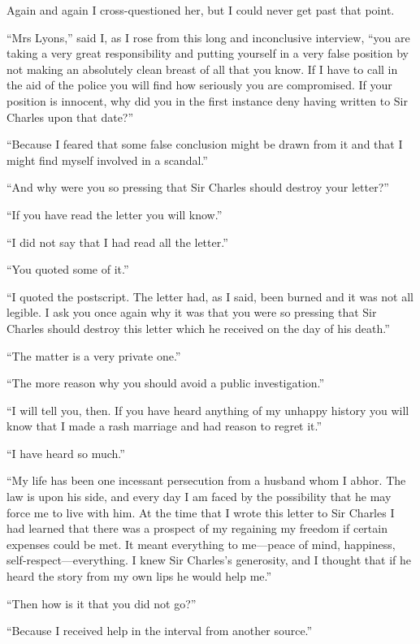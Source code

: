 \documentclass[paper=a5,BCOR=7mm,twoside,DIV=calc,12pt,usegeometry,openany,chapterprefix,endperiod,headings=big]{scrbook} %
\begin{document}
Again and again I cross-questioned her, but I could never get past that point.

\enquote{Mrs Lyons,} said I, as I rose from this long and inconclusive interview, \enquote{you are taking a very great responsibility and putting yourself in a very false position by not making an absolutely clean breast of all that you know. If I have to call in the aid of the police you will find how seriously you are compromised. If your position is innocent, why did you in the first instance deny having written to Sir Charles upon that date?}

\enquote{Because I feared that some false conclusion might be drawn from it and that I might find myself involved in a scandal.}

\enquote{And why were you so pressing that Sir Charles should destroy your letter?}

\enquote{If you have read the letter you will know.}

\enquote{I did not say that I had read all the letter.}

\enquote{You quoted some of it.}

\enquote{I quoted the postscript. The letter had, as I said, been burned and it was not all legible. I ask you once again why it was that you were so pressing that Sir Charles should destroy this letter which he received on the day of his death.}

\enquote{The matter is a very private one.}

\enquote{The more reason why you should avoid a public investigation.}

\enquote{I will tell you, then. If you have heard anything of my unhappy history you will know that I made a rash marriage and had reason to regret it.}

\enquote{I have heard so much.}

\enquote{My life has been one incessant persecution from a husband whom I abhor. The law is upon his side, and every day I am faced by the possibility that he may force me to live with him. At the time that I wrote this letter to Sir Charles I had learned that there was a prospect of my regaining my freedom if certain expenses could be met. It meant everything to me---peace of mind, happiness, self-respect---everything. I knew Sir Charles's generosity, and I thought that if he heard the story from my own lips he would help me.}

\enquote{Then how is it that you did not go?}

\enquote{Because I received help in the interval from another source.}
\end{document}
